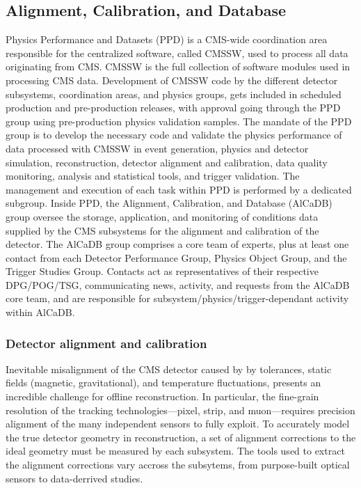 \subsection{Alignment, Calibration, and Database}
\label{sec:AlCaDB}

Physics Performance and Datasets (PPD) is a CMS-wide coordination area responsible for the centralized software, called CMSSW, used to process all data originating from CMS. CMSSW is the full collection of software modules used in processing CMS data. Development of CMSSW code by the different detector subsystems, coordination areas, and physics groups, gets included in scheduled production and pre-production releases, with approval going through the PPD group using pre-production physics validation samples. The mandate of the PPD group is to develop the necessary code and validate the physics performance of data processed with CMSSW in event generation, physics and detector simulation, reconstruction, detector alignment and calibration, data quality monitoring, analysis and statistical tools, and trigger validation. The management and execution of each task within PPD is performed by a dedicated subgroup. Inside PPD, the Alignment, Calibration, and Database (AlCaDB) group oversee the storage, application, and monitoring of conditions data supplied by the CMS subsystems for the alignment and calibration of the detector. The AlCaDB group comprises a core team of experts, plus at least one contact from each Detector Performance Group, Physics Object Group, and the Trigger Studies Group. Contacts act as representatives of their respective DPG/POG/TSG, communicating news, activity, and requests from the AlCaDB core team, and are responsible for subsystem/physics/trigger-dependant activity within AlCaDB.

\subsubsection{Detector alignment and calibration}

Inevitable misalignment of the CMS detector caused by by tolerances, static fields (magnetic, gravitational), and temperature fluctuations, presents an incredible challenge for offline reconstruction. In particular, the fine-grain resolution of the tracking technologies---pixel, strip, and muon---requires precision alignment of the many independent sensors to fully exploit. To accurately model the true detector geometry in reconstruction, a set of alignment corrections to the ideal geometry must be measured by each subsystem. The tools used to extract the alignment corrections vary accross the subsytems, from purpose-built optical sensors to data-derrived studies.


